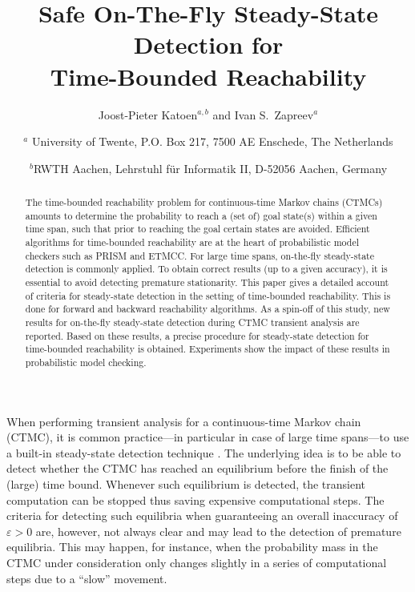 \documentclass[times, 10pt,twocolumn]{article}
\begin{document}
\title{Safe On-The-Fly Steady-State Detection for \\ Time-Bounded Reachability}

\author{
   Joost-Pieter Katoen{$^{a,b}$}
   and Ivan S.\ Zapreev{$^{a}$}
   \and
   {$^{a}$}
   \small{University of Twente, P.O. Box 217, 7500 AE Enschede, 
           The Netherlands}\\
   \and
   {$^{b}$}\small{RWTH Aachen, Lehrstuhl f\"ur Informatik II, D-52056 Aachen, 
           Germany}
}

\date{}



\maketitle
\thispagestyle{empty}

\begin{abstract}
The time-bounded reachability problem for continuous-time Markov chains (CTMCs) amounts 
to determine the probability to reach a (set of) goal state(s) within a given time span, such that 
prior to reaching the goal certain states are avoided. 
Efficient algorithms for time-bounded reachability are at the heart of probabilistic model checkers
such as PRISM and ETMCC.
For large time spans, on-the-fly steady-state detection is commonly applied. 
To obtain correct results (up to a given accuracy), it is essential to avoid detecting premature stationarity. 
This paper gives a detailed account of criteria for  steady-state detection in the setting of time-bounded reachability. 
This is done for forward and backward reachability algorithms.  
As a spin-off of this study, new results for on-the-fly steady-state detection during CTMC 
transient analysis are reported.  
Based on these results, a precise procedure for steady-state detection for time-bounded 
reachability is obtained.  
Experiments show the impact of these results in probabilistic model checking.
\end{abstract}

When performing transient analysis for a continuous-time Markov chain (CTMC), it is common practice---in particular in case of large time spans---to use a built-in steady-state detection technique \cite{MalhotraMT_MR94,YounesKNP_STTT05}. 
The underlying idea is to be able to detect whether the CTMC has reached an equilibrium before the finish of the (large) time bound. Whenever such equilibrium is detected, the transient computation can be stopped thus saving expensive computational steps. 
The criteria for detecting such equilibria when guaranteeing an overall inaccuracy of $\varepsilon > 0$ are, however, not always clear and may lead to the detection of premature equilibria. 
This may happen, for instance, when the probability mass in the CTMC under consideration only changes slightly in a series of computational steps due to a ``slow'' movement.
\end{document}
